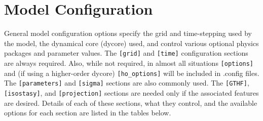 \section{Model Configuration}
\label{ug.sec.config}

General model configuration options 
specify the grid and time-stepping used by the model, 
the dynamical core (dycore) used, 
and control various optional physics packages and parameter values.
The \texttt{[grid]} and \texttt{[time]} configuration sections are always required.
Also, while not required, in almost all situations  \texttt{[options]} 
and (if using a higher-order dycore) \texttt{[ho\_options]} will be included in .config files.
The \texttt{[parameters]} and \texttt{[sigma]} sections are also commonly used.  
The \texttt{[GTHF]}, \texttt{[isostasy]}, and \texttt{[projection]} sections
are needed only if the associated features are desired.  Details of each of these
sections, what they control, and the available options for each section are listed 
in the tables below.

